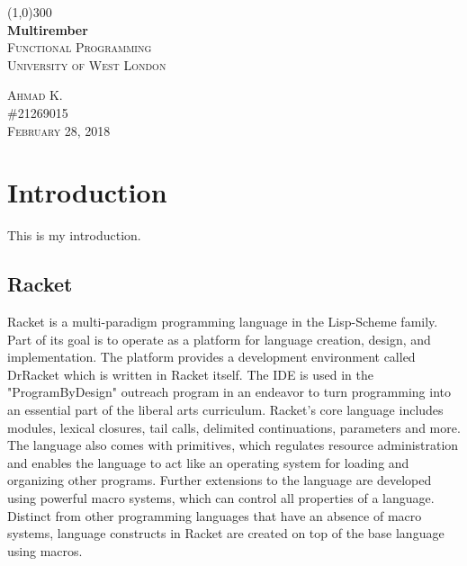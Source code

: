 \documentclass{article}
\begin{document}
\begin{titlepage}
	\begin{center}
	\line(1,0){300} \\
	\huge{\bfseries Multirember} \\
	[1.5cm]
	\textsc{\LARGE Functional Programming} \\
	\textsc{\LARGE University of West London} \\
	[10cm]
	\end{center}
	
	\begin{flushright}
	\textsc{\large Ahmad K. \\
	\#21269015 \\
	February 28, 2018 \\}
	\end{flushright}
\end{titlepage}

\tableofcontents
\thispagestyle{empty}
\cleardoublepage

\setcounter{page}{1}



\section{Introduction}\label{sec:intro}
This is my introduction.

\subsection{Racket}
Racket is a multi-paradigm programming language in the Lisp-Scheme family. Part of its goal is to operate as a platform for language creation, design, and implementation. The platform provides a development environment called DrRacket which is written in Racket itself. The IDE is used in the "ProgramByDesign" outreach program in an endeavor to turn programming into an essential part of the liberal arts curriculum. Racket's core language includes modules, lexical closures, tail calls, delimited continuations, parameters and more.
The language also comes with primitives, which regulates resource administration and enables the language to act like an operating system for loading and organizing other programs.
Further extensions to the language are developed using powerful macro systems, which can control all properties of a language. Distinct from other programming languages that have an absence of macro systems, language constructs in Racket are created on top of the base language using macros.\\
\end{document}
